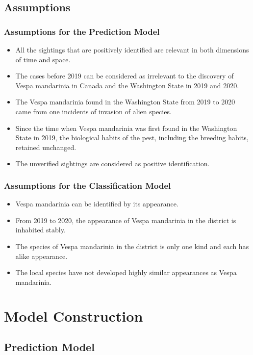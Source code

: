 \documentclass{mcmthesis}
\begin{document}
\subsection{Assumptions}
\subsubsection{Assumptions for the Prediction Model}
\begin{itemize}
    \item All the sightings that are positively identified are relevant in both dimensions of time and space.
    \item The cases before 2019 can be considered as irrelevant to the discovery of Vespa mandarinia in Canada and the Washington State in 2019 and 2020.
    \item The Vespa mandarinia found in the Washington State from 2019 to 2020 came from one incidents of invasion of alien species.
    \item Since the time when Vespa mandarinia was first found in the Washington State in 2019, the biological habits of the pest, including the breeding habits, retained unchanged.
    \item The unverified sightings are considered as positive identification.
\end{itemize}

\subsubsection{Assumptions for the Classification Model}
\begin{itemize}
    \item Vespa mandarinia can be identified by its appearance.
    \item From 2019 to 2020, the appearance of Vespa mandarinia in the district is inhabited stably.
    \item The species of Vespa mandarinia in the district is only one kind and each has alike appearance.
    \item The local species have not developed highly similar appearances as Vespa mandarinia. 
\end{itemize}




\section{Model Construction}

\subsection{Prediction Model}
\end{document}
